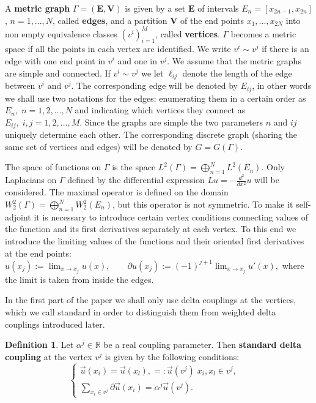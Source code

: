 \documentclass{amsart}
\theoremstyle{definition}
\newtheorem{definition}[theorem]{Definition}
\theoremstyle{remark}
\numberwithin{equation}{section}
\newcommand{\vu}{\vec{u}}
\begin{document}
 A {\bf metric graph} $\Gamma = (\mathbf E, \mathbf V) $ is given by a set $\mathbf{E}$ of intervals $E_n=[x_{2n-1},x_{2n}]$, $n=1,...,N$, called {\bf edges}, 
 and a partition $\mathbf{V}$ of the end points $x_1,...,x_{2N}$ into non empty equivalence classes  $(v^i)_{i=1}^M$, called {\bf vertices}. $\Gamma$ becomes a metric space 
 if  all the points in each vertex are identified. We write $v^i \sim v^j$ if there is an edge with one end point in $v^i$ and one in $v^j$. We assume that 
 the metric graphs are simple and connected. If $v^i \sim v^j$ we let $\ell_{ij}$ denote the length of the edge between $v^i$ and $v^j$.
  The corresponding edge will be denoted by $ E_{ij}$, in other words we shall use two notations for the edges:  enumerating them in a certain order
  as $ E_n, \; n= 1,2, \dots, N$ and indicating which vertices they connect as $ E_{ij}, \; i,j = 1,2, \dots, M.$ Since the graphs are simple the two parameters
  $ n $ and $ ij $ uniquely determine each other. 
  The corresponding discrete graph (sharing the same set of vertices and edges) will be denoted by $ G = G(\Gamma).$

The space of functions on $\Gamma$ is the space $L^2(\Gamma)=\bigoplus_{n=1}^NL^2(E_n)$. 
Only  Laplacians on $ \Gamma $ defined by the differential expression
$ L u = - \frac{d^2}{dx^2} u $
will be considered. The maximal operator is defined on the domain $ W_2^2 (\Gamma) = \bigoplus_{n=1}^N W_2^2 (E_n) $, but this operator is not symmetric.
To make it self-adjoint it is necessary to introduce certain vertex conditions
connecting values of the function and its first derivatives separately at each vertex.  To this end we introduce
the limiting values of the functions and their oriented first derivatives at the end points:
$
u(x_j) := \lim_{x \rightarrow x_j} u(x), \qquad \partial u(x_j) := (-1)^{j+1}  \lim_{x \rightarrow x_j}  u'(x),
$
where the limit is taken from inside the edges.


In the first part of the paper we shall only use delta couplings at the vertices, which we call  standard
in order to distinguish them from weighted delta couplings introduced later.

\begin{definition}
Let  $ \alpha^j  \in \mathbb R $ be a real coupling parameter. Then  
{\bf standard delta coupling} at the vertex $ v^j $ is given by the following conditions:
\begin{equation} \label{sdc}
\left\{
\begin{array}{l}
\vu (x_i) = \vu (x_l),=: \vu (v^j) \; x_i, x_l \in v^j, \quad   \\[3mm]
\sum_{x_i \in v^j} \partial \vu (x_i) = \alpha^j  \vu (v^j). 
\end{array} \right.
\end{equation}
\end{definition}
\end{document}
